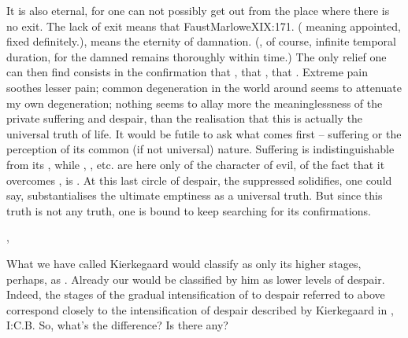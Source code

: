 It is also eternal, for one can not possibly get out from the place where there
is no  exit. The lack of exit means that \citet{no end is limited to
  damned souls}{FaustMarlowe}{XIX:171. ( meaning appointed, fixed
  definitely.)}, means the eternity of damnation. (, of
course, infinite temporal duration, for the damned remains thoroughly within
time.)  The only relief one can then find consists in the confirmation that
, that , that .  Extreme pain soothes lesser pain; common degeneration in the world
around seems to attenuate my own degeneration; nothing seems to allay more the
meaninglessness of the private suffering and despair, than the realisation that
this is actually the universal truth of life. It would be futile to ask what
comes first -- suffering or the perception of its common (if not universal)
nature. Suffering is indistinguishable from its , while
, , etc. are here only  of
the  character of evil, of the fact that it overcomes , is
.  At this last circle of despair, the suppressed
 solidifies, one could say, {substantialises} the ultimate emptiness
as a universal truth. But since this  truth is not any truth, one is
bound to keep searching for its confirmations.




\sep

\pa What we have called  Kierkegaard would classify as only its
higher stages, perhaps, as . Already our  would be classified by him as lower levels
of despair. Indeed, the stages of the gradual intensification of  to
despair referred to above correspond closely to the intensification of despair
described by Kierkegaard in , I:C.B. 
So, what's the difference? Is there any?

